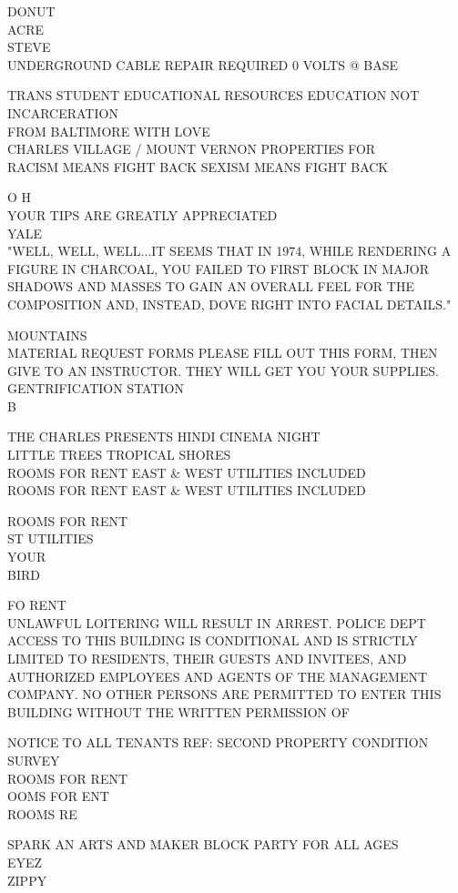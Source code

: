 \documentclass[10pt,letterpaper]{article}
\begin{document}
DONUT\\
ACRE\\
STEVE\\
UNDERGROUND CABLE REPAIR REQUIRED 0 VOLTS @ BASE

TRANS STUDENT EDUCATIONAL RESOURCES EDUCATION NOT INCARCERATION\\
FROM BALTIMORE WITH LOVE\\
CHARLES VILLAGE / MOUNT VERNON PROPERTIES FOR\\
RACISM MEANS FIGHT BACK SEXISM MEANS FIGHT BACK

O H\\
YOUR TIPS ARE GREATLY APPRECIATED\\
YALE\\
"WELL, WELL, WELL...IT SEEMS THAT IN 1974, WHILE RENDERING A FIGURE IN CHARCOAL, YOU FAILED TO FIRST BLOCK IN MAJOR SHADOWS AND MASSES TO GAIN AN OVERALL FEEL FOR THE COMPOSITION AND, INSTEAD, DOVE RIGHT INTO FACIAL DETAILS."

MOUNTAINS\\
MATERIAL REQUEST FORMS PLEASE FILL OUT THIS FORM, THEN GIVE TO AN INSTRUCTOR.  THEY WILL GET YOU YOUR SUPPLIES.\\
GENTRIFICATION STATION\\
B

THE CHARLES PRESENTS HINDI CINEMA NIGHT\\
LITTLE TREES TROPICAL SHORES\\
ROOMS FOR RENT EAST \& WEST UTILITIES INCLUDED\\
ROOMS FOR RENT EAST \& WEST UTILITIES INCLUDED

ROOMS FOR RENT\\
ST UTILITIES\\
YOUR\\
BIRD

FO RENT\\
UNLAWFUL LOITERING WILL RESULT IN ARREST.  POLICE DEPT\\
ACCESS TO THIS BUILDING IS CONDITIONAL AND IS STRICTLY LIMITED TO RESIDENTS, THEIR GUESTS AND INVITEES, AND AUTHORIZED EMPLOYEES AND AGENTS OF THE MANAGEMENT COMPANY.  NO OTHER PERSONS ARE PERMITTED TO ENTER THIS BUILDING WITHOUT THE WRITTEN PERMISSION OF

NOTICE TO ALL TENANTS REF: SECOND PROPERTY CONDITION SURVEY\\
ROOMS FOR RENT\\
OOMS FOR ENT\\
ROOMS RE

SPARK AN ARTS AND MAKER BLOCK PARTY FOR ALL AGES\\
EYEZ\\
ZIPPY
\end{document}
